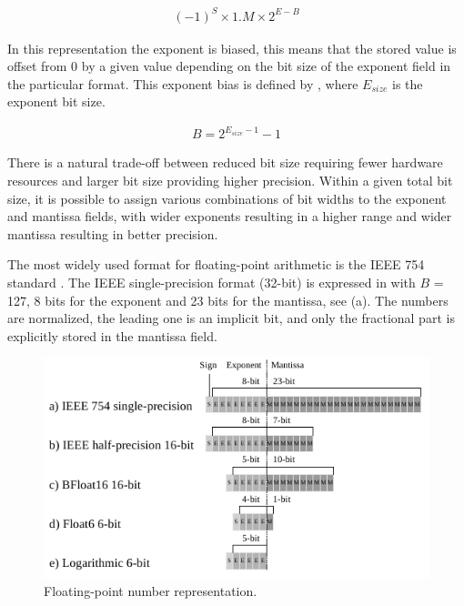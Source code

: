 \begin{eqnarray} \label{eq:float}
(-1)^{S} \times 1.M \times 2^{E-B}
\end{eqnarray}

In this representation the exponent is biased, this means that the stored value is offset from 0 by a given value depending on the bit size of the exponent field in the particular format. This exponent bias is defined by , where $E_{size}$ is the exponent bit size.

\begin{eqnarray} \label{eq:float_bias}
B=2^{E_{size}-1}-1
\end{eqnarray}

There is a natural trade-off between reduced bit size requiring fewer hardware resources and larger bit size providing higher precision. Within a given total bit size, it is possible to assign various combinations of bit widths to the exponent and mantissa fields, with wider exponents resulting in a higher range and wider mantissa resulting in better precision.

The most widely used format for floating-point arithmetic is the IEEE 754 standard \cite{zuras2008ieee}. The IEEE single-precision format (32-bit) is expressed in  with $B$ = 127, 8 bits for the exponent and 23 bits for the mantissa, see (a). The numbers are normalized, the leading one is an implicit bit, and only the fractional part is explicitly stored in the mantissa field.

\begin{figure}[h!]
	\centering
	\includegraphics[width=1\columnwidth]{../figures/power_breakdown/floating_point.pdf}
	\caption{Floating-point number representation.}
	\label{fig:floating}
\end{figure}

